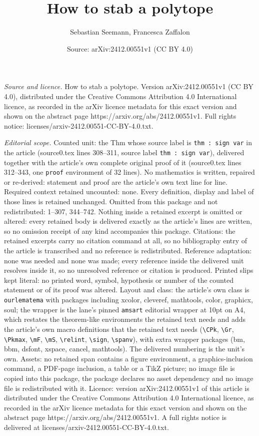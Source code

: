 \documentclass[10pt,a4paper]{amsart}
\title[How to stab a polytope]{How to stab a polytope}
\author{Sebastian Seemann, Francesca Zaffalon}
\date{Source: arXiv:2412.00551v1 (CC BY 4.0)}
\begin{document}
\maketitle

\noindent\emph{Source and licence.} How to stab a polytope. Version arXiv:2412.00551v1 (CC BY 4.0), distributed under the Creative Commons Attribution 4.0 International licence, as recorded in the arXiv licence metadata for this exact version and shown on the abstract page https://arxiv.org/abs/2412.00551v1. Full rights notice: licenses/arxiv-2412.00551-CC-BY-4.0.txt.\par\smallskip

\noindent\textit{Editorial scope.} Counted unit: the Thm whose source label is \texttt{thm : sign var} in the article (source0.tex lines 308--311, source label \texttt{thm : sign var}), delivered together with the article's own complete original proof of it (source0.tex lines 312--343, one \texttt{proof} environment of 32 lines). No mathematics is written, repaired or re-derived: statement and proof are the article's own text line for line. Required context retained uncounted: none. Every definition, display and label of those lines is retained unchanged. Omitted from this package and not redistributed: 1--307, 344--742. Nothing inside a retained excerpt is omitted or altered: every retained body is delivered exactly as the article's lines are written, so no omission receipt of any kind accompanies this package. Citations: the retained excerpts carry no citation command at all, so no bibliography entry of the article is transcribed and no reference is redistributed. Reference adaptation: none was needed and none was made; every reference inside the delivered unit resolves inside it, so no unresolved reference or citation is produced. Printed slips kept literal: no printed word, symbol, hypothesis or number of the counted statement or of its proof was altered. Layout and class: the article's own class is \texttt{ourlematema} with packages including xcolor, cleveref, mathtools, color, graphicx, soul; the wrapper is the lane's pinned \texttt{amsart} editorial wrapper at 10pt on A4, which restates the theorem-like environments the retained text needs and adds the article's own macro definitions that the retained text needs (\texttt{\textbackslash CPk}, \texttt{\textbackslash Gr}, \texttt{\textbackslash Pkmax}, \texttt{\textbackslash mF}, \texttt{\textbackslash mS}, \texttt{\textbackslash relint}, \texttt{\textbackslash sign}, \texttt{\textbackslash spanv}), with extra wrapper packages (bm, bbm, dsfont, xspace, cancel, mathtools). The delivered numbering is the unit's own. Assets: no retained span contains a figure environment, a graphics-inclusion command, a PDF-page inclusion, a table or a TikZ picture; no image file is copied into this package, the package declares no asset dependency and no image file is redistributed with it. Licence: version arXiv:2412.00551v1 of this article is distributed under the Creative Commons Attribution 4.0 International licence, as recorded in the arXiv licence metadata for this exact version and shown on the abstract page https://arxiv.org/abs/2412.00551v1. A full rights notice is delivered at licenses/arxiv-2412.00551-CC-BY-4.0.txt. 
\end{document}
